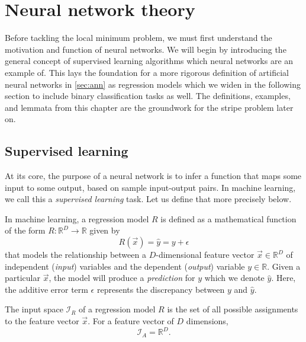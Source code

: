\chapter{Neural network theory}
\label{chap:neural_network_theory}
Before tackling the local minimum problem, we must first understand the motivation and function of neural networks.
We will begin by introducing the general concept of supervised learning algorithms which neural networks are an example of.
This lays the foundation for a more rigorous definition of artificial neural networks in \ref{sec:ann} as regression models which we widen in the following section to include binary classification tasks as well.
The definitions, examples, and lemmata from this chapter are the groundwork for the stripe problem later on.

\section{Supervised learning}
At its core, the purpose of a neural network is to infer a function that maps some input to some output, based on sample input-output pairs.
In machine learning, we call this a \textit{supervised learning} task. 
Let us define that more precisely below.

\begin{definition}
    \label{def:reg_model}
    In machine learning, a regression model $R$ is defined as a mathematical function of the form $R:\mathbb{R}^D\rightarrow \mathbb{R}$ given by
    \begin{equation}
        \label{eq:reg_model}
        R(\vec{x}) = \hat{y} = y + \epsilon
    \end{equation}
    that models the relationship between a $D$-dimensional feature vector $\vec{x} \in \mathbb{R}^D$ of independent (\textit{input}) variables and the dependent (\textit{output}) variable $y \in \mathbb{R}$. 
    Given a particular $\vec{x}$, the model will produce a \textit{prediction} for $y$ which we denote $\hat{y}$.
    Here, the additive error term $\epsilon$ represents the discrepancy between $y$ and $\hat{y}$.
\end{definition}

\begin{definition}
    \label{def:input_space}
    The input space $\mathcal{I}_R$ of a regression model $R$ is the set of all possible assignments to the feature vector $\vec{x}$.
    For a feature vector of $D$ dimensions,
    \begin{equation}
        \mathcal{I}_A=\mathbb{R}^D.
    \end{equation}
\end{definition}

